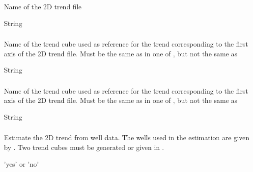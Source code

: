 {\subsubsection{}
 \slist
   \item \Description Name of the 2D trend file
   \item \Argument String
   \item \Default
 \elist

\subsubsection{}
 \slist
   \item \Description Name of the trend cube used as reference for the trend corresponding to the first axis of the 2D trend file. Must be the same as  in one of , but not the same as 
   \item \Argument String
   \item \Default
 \elist

\subsubsection{}
 \slist
   \item \Description  Name of the trend cube used as reference for the trend corresponding to the first axis of the 2D trend file. Must be the same as  in one of , but not the same as 
   \item \Argument String
   \item \Default
 \elist

\subsubsection{}
 \slist
   \item \Description Estimate the 2D trend from well data. The wells used in the estimation are given by . Two trend cubes must be generated or given in .
   \item \Argument 'yes' or 'no'
   \item \Default
 \elist

}
